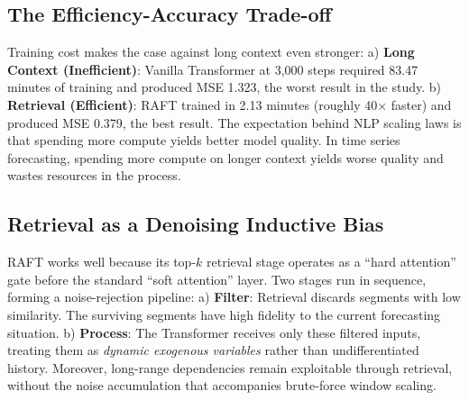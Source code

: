 \documentclass{article} %
\begin{document}
\subsection{The Efficiency-Accuracy Trade-off}
Training cost makes the case against long context even stronger: a) \textbf{Long Context (Inefficient)}: Vanilla Transformer at 3,000 steps required 83.47 minutes of training and produced MSE 1.323, the worst result in the study. b) \textbf{Retrieval (Efficient)}: RAFT trained in 2.13 minutes (roughly 40$\times$ faster) and produced MSE 0.379, the best result.
The expectation behind NLP scaling laws is that spending more compute yields better model quality. In time series forecasting, spending more compute on longer context yields worse quality and wastes resources in the process.

\subsection{Retrieval as a Denoising Inductive Bias}
RAFT works well because its top-$k$ retrieval stage operates as a ``hard attention'' gate before the standard ``soft attention'' layer. Two stages run in sequence, forming a noise-rejection pipeline: a) \textbf{Filter}: Retrieval discards segments with low similarity. The surviving segments have high fidelity to the current forecasting situation. b) \textbf{Process}: The Transformer receives only these filtered inputs, treating them as \textit{dynamic exogenous variables} \citep{arango2025chronosx} rather than undifferentiated history.
Moreover, long-range dependencies remain exploitable through retrieval, without the noise accumulation that accompanies brute-force window scaling.
\end{document}
